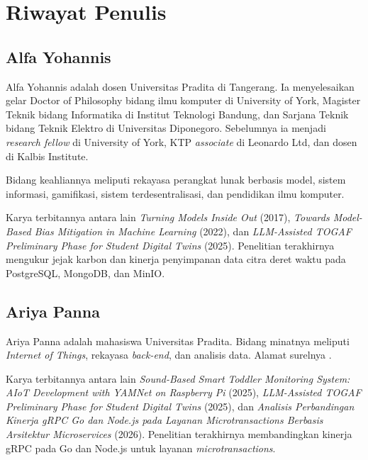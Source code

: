 \chapter{Riwayat Penulis}

\section*{Alfa Yohannis}

Alfa Yohannis adalah dosen Universitas Pradita di Tangerang. Ia menyelesaikan gelar Doctor of Philosophy bidang ilmu komputer di University of York, Magister Teknik bidang Informatika di Institut Teknologi Bandung, dan Sarjana Teknik bidang Teknik Elektro di Universitas Diponegoro. Sebelumnya ia menjadi \textit{research fellow} di University of York, KTP \textit{associate} di Leonardo Ltd, dan dosen di Kalbis Institute.

Bidang keahliannya meliputi rekayasa perangkat lunak berbasis model, sistem informasi, gamifikasi, sistem terdesentralisasi, dan pendidikan ilmu komputer.

Karya terbitannya antara lain \textit{Turning Models Inside Out} (2017), \textit{Towards Model-Based Bias Mitigation in Machine Learning} (2022), dan \textit{LLM-Assisted TOGAF Preliminary Phase for Student Digital Twins} (2025). Penelitian terakhirnya mengukur jejak karbon dan kinerja penyimpanan data citra deret waktu pada PostgreSQL, MongoDB, dan MinIO.

\section*{Ariya Panna}

Ariya Panna adalah mahasiswa Universitas Pradita. Bidang minatnya meliputi \textit{Internet of Things}, rekayasa \textit{back-end}, dan analisis data. Alamat surelnya .

Karya terbitannya antara lain \textit{Sound-Based Smart Toddler Monitoring System: AIoT Development with YAMNet on Raspberry Pi} (2025), \textit{LLM-Assisted TOGAF Preliminary Phase for Student Digital Twins} (2025), dan \textit{Analisis Perbandingan Kinerja gRPC Go dan Node.js pada Layanan Microtransactions Berbasis Arsitektur Microservices} (2026). Penelitian terakhirnya membandingkan kinerja gRPC pada Go dan Node.js untuk layanan \textit{microtransactions}.
